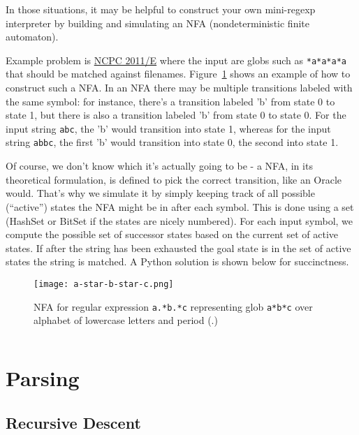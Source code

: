 In those situations, it may be helpful to construct your own mini-regexp interpreter by building
and simulating an NFA (nondeterministic finite automaton).

Example problem is \href{http://ncpc.idi.ntnu.no/ncpc2011/ncpc2011problems.pdf}{NCPC 2011/E}
where the input are globs such as \texttt{*a*a*a*a} that should be matched against filenames.
Figure~\ref{fig:nfaexample} shows an example of how to construct such a NFA.
In an NFA there may be multiple transitions labeled with the same symbol: for instance,
there's a transition labeled 'b' from state 0 to state 1, but there is also a transition
labeled 'b' from state 0 to state 0.  For the input string \texttt{abc}, the 'b' would
transition into state 1, whereas for the input string \texttt{abbc}, the first 'b' would
transition into state 0, the second into state 1.

Of course, we don't know which it's actually going to be - a NFA, in its theoretical 
formulation, is defined to pick the correct transition, like an Oracle would.  That's why we simulate
it by simply keeping track of all possible (``active'') states the NFA might be in after each symbol.
This is done using a set (HashSet or BitSet if the states are nicely numbered).
For each input symbol, we compute the possible set of successor states based on the
current set of active states.  If after the string has been exhausted the goal state
is in the set of active states the string is matched.
A Python solution is shown below for succinctness.

\begin{figure}
    \centering
    \texttt{[image: a-star-b-star-c.png]}
    \caption{NFA for regular expression \texttt{a.*b.*c} representing glob \texttt{a*b*c}
        over alphabet of lowercase letters and period (.)}
    \label{fig:nfaexample}
\end{figure}

\inputminted[fontsize=\footnotesize,linenos=true]{python}{code/ls.py}

\section{Parsing}
\subsection{Recursive Descent}

